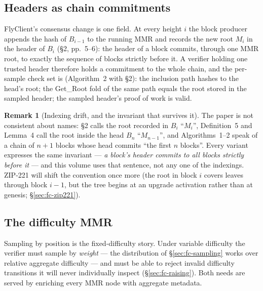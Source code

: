 \documentclass[11pt,a4paper]{article}
\theoremstyle{definition}
\newtheorem{remark}[theorem]{Remark}
\begin{document}
\subsection{Headers as chain commitments}\label{sec:fc-chaincommit}

FlyClient's consensus change is one field. At every height $i$ the block
producer appends the hash of $B_{i-1}$ to the running MMR and records the
new root $M_i$ in the header of $B_i$ (\S2, pp.~5--6): the header of a
block commits, through one MMR root, to exactly the sequence of blocks
strictly before it. A verifier holding one trusted header therefore holds a
commitment to the whole chain, and the per-sample check set is
(Algorithm~2 with \S2): the inclusion path hashes to the head's root; the
\textsf{Get\_Root} fold of the same path equals the root stored in the
sampled header; the sampled header's proof of work is valid.

\begin{remark}[Indexing drift, and the invariant that survives it]
\label{rem:fc-indexing}
The paper is not consistent about names: \S2 calls the root recorded in
$B_i$ ``$M_i$'', Definition~5 and Lemma~4 call the root inside the head
$B_n$ ``$M_{n-1}$'', and Algorithms~1--2 speak of a chain of $n+1$ blocks
whose head commits ``the first $n$ blocks''. Every variant expresses the
same invariant --- \emph{a block's header commits to all blocks strictly
before it} --- and this volume uses that sentence, not any one of the
indexings. ZIP-221 will shift the convention once more (the root in block
$i$ covers leaves through block $i-1$, but the tree begins at an upgrade
activation rather than at genesis; \S\ref{sec:fc-zip221}).
\end{remark}

\subsection{The difficulty MMR}\label{sec:fc-diffmmr}

Sampling by position is the fixed-difficulty story. Under variable
difficulty the verifier must sample by \emph{weight} --- the distribution
of \S\ref{sec:fc-sampling} works over relative aggregate difficulty --- and
must be able to reject invalid difficulty transitions it will never
individually inspect (\S\ref{sec:fc-raising}). Both needs are served by
enriching every MMR node with aggregate metadata.
\end{document}
